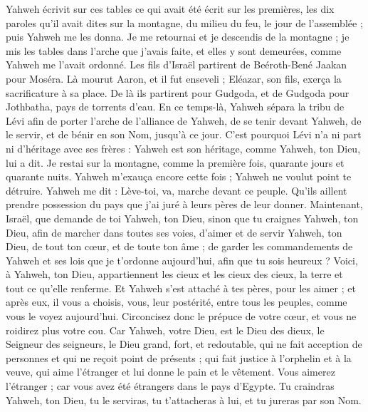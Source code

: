 \begin{multicols}{2}
Yahweh écrivit sur ces tables ce qui avait été écrit sur les premières, les dix paroles qu’il avait dites sur la montagne, du milieu du feu, le jour de l'assemblée ; puis Yahweh me les donna.
Je me retournai et je descendis de la montagne ; je mis les tables dans l'arche que j'avais faite, et elles y sont demeurées, comme Yahweh me l'avait ordonné.
Les fils d'Israël partirent de Beéroth-Bené Jaakan pour Moséra. Là mourut Aaron, et il fut enseveli ; Eléazar, son fils, exerça la sacrificature à sa place.
De là ils partirent pour Gudgoda, et de Gudgoda pour Jothbatha, pays de torrents d'eau.
En ce temps-là, Yahweh sépara la tribu de Lévi afin de porter l'arche de l'alliance de Yahweh, de se tenir devant Yahweh, de le servir, et de bénir en son Nom, jusqu'à ce jour.
C'est pourquoi Lévi n'a ni part ni d'héritage avec ses frères : Yahweh est son héritage, comme Yahweh, ton Dieu, lui a dit.
Je restai sur la montagne, comme la première fois, quarante jours et quarante nuits. Yahweh m'exauça encore cette fois ; Yahweh ne voulut point te détruire.
Yahweh me dit : Lève-toi, va, marche devant ce peuple. Qu'ils aillent prendre possession du pays que j'ai juré à leurs pères de leur donner.
Maintenant, Israël, que demande de toi Yahweh, ton Dieu, sinon que tu craignes Yahweh, ton Dieu, afin de marcher dans toutes ses voies, d’aimer et de servir Yahweh, ton Dieu, de tout ton cœur, et de toute ton âme ;
de garder les commandements de Yahweh et ses lois que je t’ordonne aujourd'hui, afin que tu sois heureux ?
Voici, à Yahweh, ton Dieu, appartiennent les cieux et les cieux des cieux, la terre et tout ce qu’elle renferme.
Et Yahweh s’est attaché à tes pères, pour les aimer ; et après eux, il vous a choisis, vous, leur postérité, entre tous les peuples, comme vous le voyez aujourd'hui.
Circoncisez donc le prépuce de votre cœur, et vous ne roidirez plus votre cou.
Car Yahweh, votre Dieu, est le Dieu des dieux, le Seigneur des seigneurs, le Dieu grand, fort, et redoutable, qui ne fait acception de personnes et qui ne reçoit point de présents ;
qui fait justice à l'orphelin et à la veuve, qui aime l'étranger et lui donne le pain et le vêtement.
Vous aimerez l'étranger ; car vous avez été étrangers dans le pays d'Egypte.
Tu craindras Yahweh, ton Dieu, tu le serviras, tu t'attacheras à lui, et tu jureras par son Nom.

\end{multicols}
